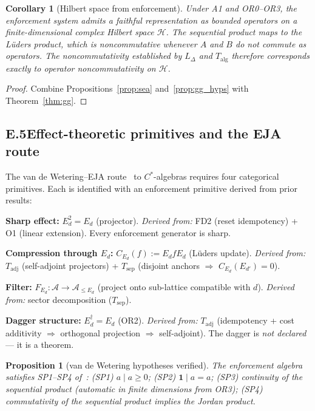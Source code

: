 \documentclass[11pt]{article}
\newtheorem{proposition}[theorem]{Proposition}
\newtheorem{corollary}[theorem]{Corollary}
\theoremstyle{remark}
\begin{document}
\begin{corollary}[Hilbert space from enforcement]
\label{cor:hilbert_sea}
Under A1 and OR0--OR3, the enforcement system admits a faithful representation as bounded operators on a finite-dimensional complex Hilbert space $\mathcal{H}$.  The sequential product maps to the L\"{u}ders product, which is noncommutative whenever $A$ and $B$ do not commute as operators.  The noncommutativity established by $L_\Delta$ and $T_{\mathrm{alg}}$ therefore corresponds exactly to operator noncommutativity on $\mathcal{H}$.
\end{corollary}

\begin{proof}
Combine Propositions~\ref{prop:sea} and~\ref{prop:gg_hyps} with Theorem~\ref{thm:gg}.
\end{proof}

\subsection*{E.5\quad Effect-theoretic primitives and the EJA route}
\label{app:effect_theory}

The van de Wetering--EJA route~\cite{vandeWetering2019} to $C^*$-algebras requires four categorical primitives.  Each is identified with an enforcement primitive derived from prior results:

\medskip\noindent\textbf{Sharp effect:} $E_d^2 = E_d$ (projector).  \textit{Derived from:} FD2 (reset idempotency) + O1 (linear extension).  Every enforcement generator is sharp.

\smallskip\noindent\textbf{Compression through $E_d$:} $C_{E_d}(f) := E_d f E_d$ (L\"uders update).  \textit{Derived from:} $T_{\mathrm{adj}}$ (self-adjoint projectors) + $T_{\mathrm{sep}}$ (disjoint anchors $\Rightarrow$ $C_{E_d}(E_{d'}) = 0$).

\smallskip\noindent\textbf{Filter:} $F_{E_d}: \mathcal{A} \to \mathcal{A}_{\le E_d}$ (project onto sub-lattice compatible with $d$).  \textit{Derived from:} sector decomposition ($T_{\mathrm{sep}}$).

\smallskip\noindent\textbf{Dagger structure:} $E_d^\dagger = E_d$ (OR2).  \textit{Derived from:} $T_{\mathrm{adj}}$ (idempotency + cost additivity $\Rightarrow$ orthogonal projection $\Rightarrow$ self-adjoint).  The dagger is \emph{not declared} --- it is a theorem.

\begin{proposition}[van de Wetering hypotheses verified]
\label{prop:vdw}
The enforcement algebra satisfies SP1--SP4 of~\cite{vandeWetering2019}: (SP1) $a \mid a \ge 0$; (SP2) $\mathbf{1} \mid a = a$; (SP3) continuity of the sequential product (automatic in finite dimensions from OR3); (SP4) commutativity of the sequential product implies the Jordan product.
\end{proposition}
\end{document}
